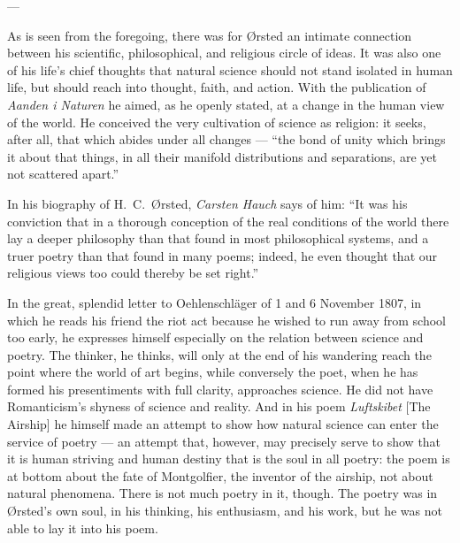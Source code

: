 \documentclass[12pt,a4paper]{book}
\newcommand{\opage}[1]{\marginnote{\footnotesize\textit{[#1]}}}
\begin{document}
\begin{center}---\end{center}

As is seen from the foregoing, there was for Ørsted an intimate connection between his
scientific, \opage{54}philosophical, and religious circle of ideas. It was also one of his
life's chief thoughts that natural science should not stand isolated in human life,
but should reach into thought, faith, and action. With the publication of \emph{Aanden
i Naturen} he aimed, as he openly stated, at a change in the human view of the world.
He conceived the very cultivation of science as religion: it seeks, after all, that
which abides under all changes --- ``the bond of unity which brings it about that
things, in all their manifold distributions and separations, are yet not scattered
apart.''

In his biography of H.\ C.\ Ørsted, \emph{Carsten Hauch} says of him: ``It was his conviction
that in a thorough conception of the real conditions of the world there lay a deeper
philosophy than that found in most philosophical systems, and a truer poetry than that
found in many poems; indeed, he even thought that our religious views too could
thereby be set right.''

In the great, splendid letter to Oehlenschläger of 1 and 6 November 1807, in which he
reads his friend the riot act because he wished to run away from school too early, he
expresses himself especially on the relation between science and poetry. The thinker,
he thinks, will only at the end of his wandering reach the point where the world of
art begins, while conversely the poet, when he has formed his presentiments with full
clarity, approaches science. He did not have Romanticism's shyness of science and
reality. And in his poem \emph{Luftskibet} [The Airship] he himself made an attempt to
show how natural science can enter the service of poetry --- an attempt that, however,
may precisely serve to show that it is human striving and human destiny that is the
soul in all poetry: the poem is at bottom about the fate of Montgolfier, the inventor
of the airship, not about natural phenomena. There is not much poetry in it, though.
The poetry was in Ørsted's own soul, in his thinking, his enthusiasm, and his work,
but he was not able to lay it into his poem.
\end{document}
